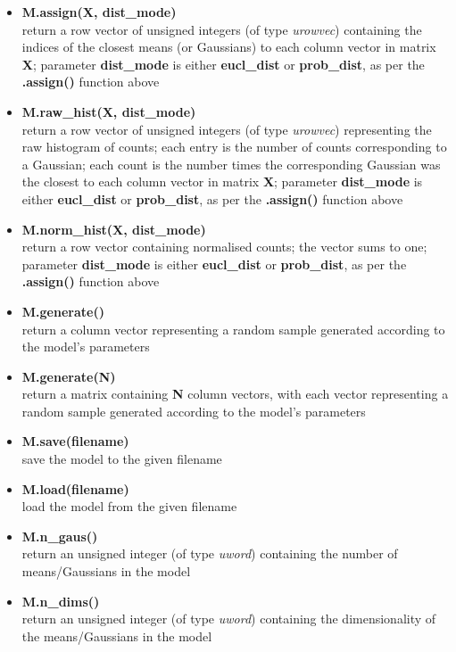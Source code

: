 \begin{small}
\begin{itemize}
\item
{\bf M.assign(X, dist\_mode)}\\
return a row vector of unsigned integers (of type {\it urowvec}) containing the indices of the closest means (or Gaussians) to each column vector in matrix {\bf X};
parameter {\bf dist\_mode} is either {\bf eucl\_dist} or {\bf prob\_dist}, as per the {\bf .assign()} function above

\item
{\bf M.raw\_hist(X, dist\_mode)}\\
return a row vector of unsigned integers (of type {\it urowvec}) representing the raw histogram of counts;
each entry is the number of counts corresponding to a Gaussian;
each count is the number times the corresponding Gaussian was the closest to each column vector in matrix {\bf X};
parameter {\bf dist\_mode} is either {\bf eucl\_dist} or {\bf prob\_dist}, as per the {\bf .assign()} function above

\item
{\bf M.norm\_hist(X, dist\_mode)}\\
return a row vector containing normalised counts; the vector sums to one;
parameter {\bf dist\_mode} is either {\bf eucl\_dist} or {\bf prob\_dist}, as per the {\bf .assign()} function above

\item
{\bf M.generate()}\\
return a column vector representing a random sample generated according to the model's parameters

\item
{\bf M.generate(N)}\\
return a matrix containing {\bf N} column vectors, with each vector representing a random sample generated according to the model's parameters

\item
{\bf M.save(filename)}\\
save the model to the given filename

\item
{\bf M.load(filename)}\\
load the model from the given filename

\item
{\bf M.n\_gaus()}\\
return an unsigned integer (of type {\it uword}) containing the number of means/Gaussians in the model

\item
{\bf M.n\_dims()}\\
return an unsigned integer (of type {\it uword}) containing the dimensionality of the means/Gaussians in the model


\end{itemize}
\end{small}
